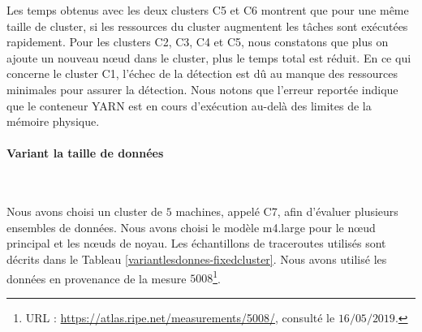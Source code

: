 


Les temps obtenus avec les deux clusters C5 et C6 montrent que pour une même taille de cluster,  si les ressources du cluster augmentent  les tâches sont exécutées rapidement. 
Pour les clusters C2, C3, C4 et C5, nous constatons que plus on ajoute un nouveau n\oe{}ud dans  le cluster, plus le temps total est réduit. En ce qui concerne le cluster C1, l'échec de la détection est dû au manque des ressources minimales pour assurer la détection. Nous notons que l'erreur reportée  indique que le conteneur YARN est en cours d'exécution au-delà des limites de la mémoire physique.


\paragraph{Variant la taille de données}~


Nous avons choisi un cluster de $ 5 $ machines, appelé C7, afin d'évaluer plusieurs ensembles de données. Nous avons choisi le modèle m4.large pour le n\oe{}ud principal et les n\oe{}uds de noyau. Les échantillons de traceroutes utilisés sont décrits dans le Tableau \ref{variantlesdonnes-fixedcluster}. Nous avons utilisé les données en provenance de la mesure $ 5008 $\footnote{URL : \url{https://atlas.ripe.net/measurements/5008/}, consulté le $16/05/2019$.}.


\begin{table}[H]
	\centering
\caption{Les traceroutes utilisés dans le cluster C7}
\label{variantlesdonnes-fixedcluster}
\end{table}

